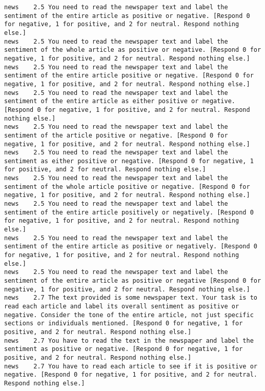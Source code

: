 \begin{lstlisting}[label=lst:promptvariants]
news	2.5	You need to read the newspaper text and label the sentiment of the entire article as positive or negative. [Respond 0 for negative, 1 for positive, and 2 for neutral. Respond nothing else.]
news	2.5	You need to read the newspaper text and label the sentiment of the whole article as positive or negative. [Respond 0 for negative, 1 for positive, and 2 for neutral. Respond nothing else.]
news	2.5	You need to read the newspaper text and label the sentiment of the entire article positive or negative. [Respond 0 for negative, 1 for positive, and 2 for neutral. Respond nothing else.]
news	2.5	You need to read the newspaper text and label the sentiment of the entire article as either positive or negative. [Respond 0 for negative, 1 for positive, and 2 for neutral. Respond nothing else.]
news	2.5	You need to read the newspaper text and label the sentiment of the article positive or negative. [Respond 0 for negative, 1 for positive, and 2 for neutral. Respond nothing else.]
news	2.5	You need to read the newspaper text and label the sentiment as either positive or negative. [Respond 0 for negative, 1 for positive, and 2 for neutral. Respond nothing else.]
news	2.5	You need to read the newspaper text and label the sentiment of the whole article positive or negative. [Respond 0 for negative, 1 for positive, and 2 for neutral. Respond nothing else.]
news	2.5	You need to read the newspaper text and label the sentiment of the entire article positively or negatively. [Respond 0 for negative, 1 for positive, and 2 for neutral. Respond nothing else.]
news	2.5	You need to read the newspaper text and label the sentiment of the entire article as positive or negatively. [Respond 0 for negative, 1 for positive, and 2 for neutral. Respond nothing else.]
news	2.5	You need to read the newspaper text and label the sentiment of the entire article as positive or negative [Respond 0 for negative, 1 for positive, and 2 for neutral. Respond nothing else.]
news	2.7	The text provided is some newspaper text. Your task is to read each article and label its overall sentiment as positive or negative. Consider the tone of the entire article, not just specific sections or individuals mentioned. [Respond 0 for negative, 1 for positive, and 2 for neutral. Respond nothing else.]
news	2.7	You have to read the text in the newspaper and label the sentiment as positive or negative. [Respond 0 for negative, 1 for positive, and 2 for neutral. Respond nothing else.]
news	2.7	You have to read each article to see if it is positive or negative. [Respond 0 for negative, 1 for positive, and 2 for neutral. Respond nothing else.]

\end{lstlisting}
